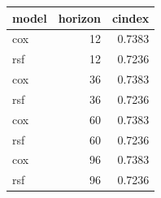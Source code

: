 \begin{tabular}{lrr}
\toprule
model & horizon & cindex \\
\midrule
cox & 12 & 0.7383 \\
rsf & 12 & 0.7236 \\
cox & 36 & 0.7383 \\
rsf & 36 & 0.7236 \\
cox & 60 & 0.7383 \\
rsf & 60 & 0.7236 \\
cox & 96 & 0.7383 \\
rsf & 96 & 0.7236 \\
\bottomrule
\end{tabular}
